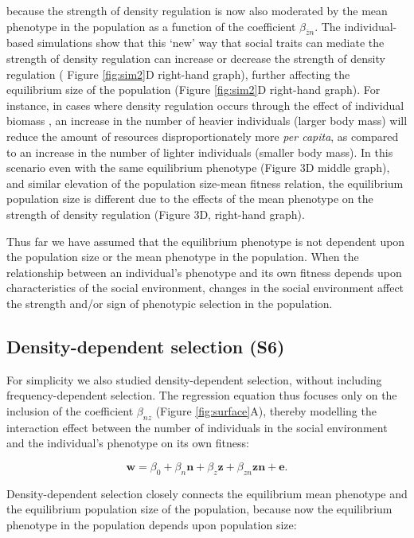 \documentclass{article}
\begin{document}
\noindent because the strength of density regulation is now also moderated by the mean phenotype in the population as a function of the coefficient  $\beta_{\bar{z}n}$. The individual-based simulations show that this `new' way that social traits can mediate the strength of density regulation can increase or decrease the strength of density regulation ( Figure \ref{fig:sim2}D right-hand graph), further affecting the equilibrium size of the population (Figure \ref{fig:sim2}D right-hand graph). For instance, in cases where density regulation occurs through the effect of individual biomass \citep{Owen-Smith2002}, an increase in the number of heavier individuals (larger body mass) will reduce the amount of resources disproportionately more \textit{per capita}, as compared to an increase in the number of lighter individuals (smaller body mass). In this scenario even with the same equilibrium phenotype (Figure 3D middle graph), and similar elevation of the population size-mean fitness relation, the equilibrium population size is different due to the effects of the mean phenotype on the strength of density regulation (Figure 3D, right-hand graph). 

Thus far we have assumed that the equilibrium phenotype is not dependent upon the population size or the mean phenotype in the population. When the relationship between an individual's phenotype and its own fitness depends upon characteristics of the social environment, changes in the social environment affect the strength and/or sign of phenotypic selection in the population. 
 
 \subsection{Density-dependent selection (S6)}
 For simplicity we also studied density-dependent selection, without including frequency-dependent selection. The regression equation thus focuses only on the inclusion of the coefficient $\beta_{nz}$ (Figure \ref{fig:surface}A), thereby modelling the interaction effect between the number of individuals in the social environment and the individual's phenotype on its own fitness:

\begin{equation} \label{eq: DDRS}
\mathbf{w}=\beta_{0} +\beta_{n} \mathbf{n} + \beta_{z} \mathbf{z}+  \beta_{zn} \mathbf{zn}  +  \mathbf{e}.
\end{equation}

\noindent Density-dependent selection closely connects the equilibrium mean phenotype and the equilibrium population size of the population, because now the equilibrium phenotype in the population depends upon population size:
\end{document}
